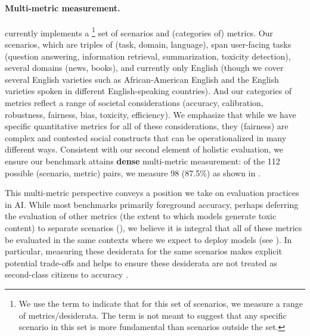 \paragraph{Multi-metric measurement.}
\benchmarkname currently implements a \core\footnote{We use the term \textit{\core} to indicate that for this set of scenarios, we measure a range of metrics/desiderata. The term \textit{\core} is not meant to suggest that any specific scenario in this set is more fundamental than scenarios outside the set.} set of \numcorescenarios scenarios and \nummetriccategories (categories of) metrics.
Our scenarios, which are triples of (task, domain, language), span \numcoretasks user-facing tasks (\eg question answering, information retrieval, summarization, toxicity detection), several domains (\eg news, books), and currently only English (though we cover several English varieties such as African-American English and the English varieties spoken in different English-speaking countries). 
And our \nummetriccategories categories of metrics reflect a range of societal considerations (\ie accuracy, calibration, robustness, fairness, bias, toxicity, efficiency).
We emphasize that while we have specific quantitative metrics for all of these considerations, they (\eg fairness) are complex and contested social constructs that can be operationalized in many different ways. 
Consistent with our second element of holistic evaluation, 
we ensure our benchmark attains \textbf{dense} multi-metric measurement: of the 112 possible (\core scenario, metric) pairs, we measure 98 (87.5\%) as shown in .

This multi-metric perspective conveys a position we take on evaluation practices in AI. 
While most benchmarks primarily foreground accuracy, perhaps deferring the evaluation of other metrics (\eg the extent to which models generate toxic content) to separate scenarios (\eg \realtoxicityprompts), we believe it is integral that all of these metrics be evaluated in the same contexts where we expect to deploy models (see ).
In particular, measuring these \nummetriccategories desiderata for the same scenarios makes explicit potential trade-offs and helps to ensure these desiderata are not treated as second-class citizens to accuracy \citep[see][]{friedman1996bias}.

